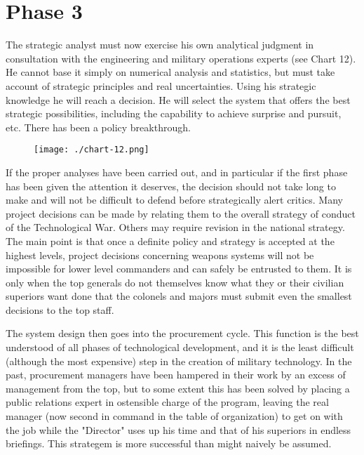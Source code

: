 \section{Phase 3}
The strategic analyst must now exercise his own analytical judgment in consultation with the engineering and military operations experts (see Chart 12). He cannot base it simply on numerical analysis and statistics, but must take account of strategic principles and real uncertainties. Using his strategic knowledge he will reach a decision. He will select the system that offers the best strategic possibilities, including the capability to achieve surprise and pursuit, etc. There has been a policy breakthrough.

\begin{figure}
    \texttt{[image: ./chart-12.png]}
    \label{fig:chart-12}
\end{figure}

If the proper analyses have been carried out, and in particular if the first phase has been given the attention it deserves, the decision should not take long to make and will not be difficult to defend before strategically alert critics. Many project decisions can be made by relating them to the overall strategy of conduct of the Technological War. Others may require revision in the national strategy. The main point is that once a definite policy and strategy is accepted at the highest levels, project decisions concerning weapons systems will not be impossible for lower level commanders and can safely be entrusted to them. It is only when the top generals do not themselves know what they or their civilian superiors want done that the colonels and majors must submit even the smallest decisions to the top staff.

The system design then goes into the procurement cycle. This function is the best understood of all phases of technological development, and it is the least difficult (although the most expensive) step in the creation of military technology. In the past, procurement managers have been hampered in their work by an excess of management from the top, but to some extent this has been solved by placing a public relations expert in ostensible charge of the program, leaving the real manager (now second in command in the table of organization) to get on with the job while the "Director" uses up his time and that of his superiors in endless briefings. This strategem is more successful than might naively be assumed.

